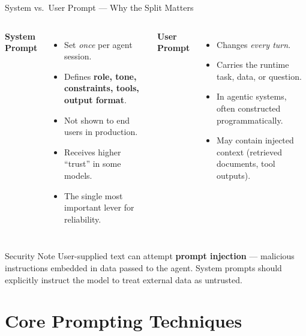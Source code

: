 \documentclass{beamer}
\begin{document}
\begin{frame}{System vs.\ User Prompt --- Why the Split Matters}
    \begin{columns}
        \textbf{System Prompt}
        \begin{itemize}
            \item Set \emph{once} per agent session.
            \item Defines \textbf{role, tone, constraints, tools, output format}.
            \item Not shown to end users in production.
            \item Receives higher ``trust'' in some models.
            \item The single most important lever for reliability.
        \end{itemize}

        \textbf{User Prompt}
        \begin{itemize}
            \item Changes \emph{every turn}.
            \item Carries the runtime task, data, or question.
            \item In agentic systems, often constructed programmatically.
            \item May contain injected context (retrieved documents, tool outputs).
        \end{itemize}
    \end{columns}

    \vspace{0.3cm}
    \begin{alertblock}{Security Note}
        User-supplied text can attempt \textbf{prompt injection} --- malicious instructions
        embedded in data passed to the agent. System prompts should explicitly instruct the
        model to treat external data as untrusted.
    \end{alertblock}
\end{frame}

\section{Core Prompting Techniques}
\end{document}
